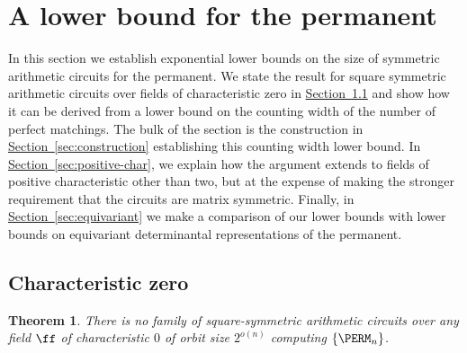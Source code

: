 \documentclass[11pt]{article}
\newcommand{\expref}[2]{\texorpdfstring{\hyperref[#2]{#1~\ref{#2}}}{#1~\ref{#2}}}
\newtheorem{theorem}{Theorem}[section]
\begin{document}
\section{A lower bound for the permanent} %
\label{sec:permanent}
In this section we establish exponential lower bounds on the size of symmetric
arithmetic circuits for the permanent.  We state the result for square
symmetric arithmetic circuits over fields of characteristic zero in
\expref{Section}{sec:char-zero} and show how it can be derived from a
lower bound on the counting width of the number of perfect matchings.
The bulk of the section is the construction in
\expref{Section}{sec:construction} establishing this counting width lower
bound.  In \expref{Section}{sec:positive-char},  we explain how the
argument extends to fields of positive characteristic other than two,
but at the expense of making the stronger requirement that the
circuits are matrix symmetric.  Finally, in
\expref{Section}{sec:equivariant} we make a comparison of our lower bounds
with lower bounds on equivariant determinantal representations of the permanent.
\subsection{Characteristic zero}\label{sec:char-zero}

\begin{theorem}\label{thm:lowerbound-square}
  There is no family of square-symmetric arithmetic circuits over any
  field $\ff$ of
  characteristic $0$ of orbit size $2^{o(n)}$ computing $\{\PERM_n\}$.
\end{theorem}
\end{document}
